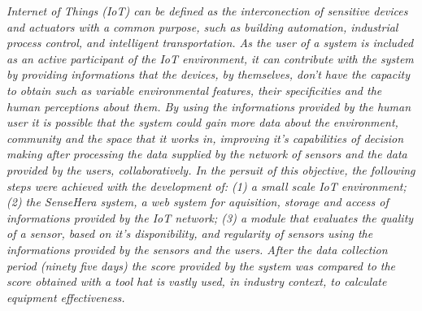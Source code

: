 \emph{
Internet of Things (IoT) can be defined as the interconection of sensitive devices and actuators with a common purpose, such as building automation, industrial process control, and intelligent transportation. %
As the user of a system is included as an active participant of the IoT environment, it can contribute with the system by providing informations that the devices, by themselves, don't have the capacity to obtain such as variable environmental features, their specificities and the human perceptions about them.
 By using the informations provided by the human user it is possible that the system could gain more data about the environment, community and the space that it works in, improving it's capabilities of decision making after processing the data supplied by the network of sensors and the data provided by the users, collaboratively.
  In the persuit of this objective, the following steps were achieved with the development of: (1) a small scale IoT environment;
  (2) the SenseHera system, a web system for aquisition, storage and access of informations provided by the IoT network;
  (3) a module that evaluates the quality of a sensor, based on it's disponibility, and regularity of sensors using the informations provided by the sensors and the users. After the data collection period (ninety five days) the score provided by the system was compared to the score obtained with a tool hat is vastly used, in industry context, to calculate equipment effectiveness.
}
